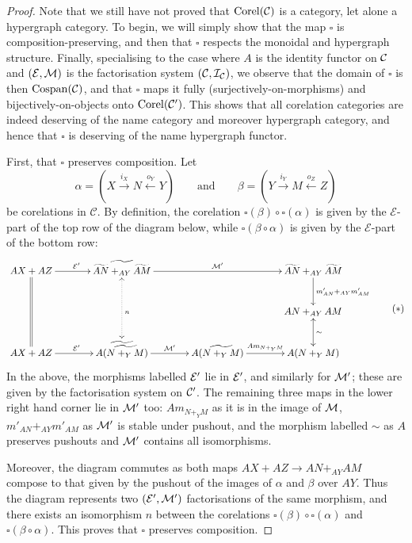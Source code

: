 \begin{proof}
  Note that we still have not proved that $\operatorname{{Corel}}(\mathcal C)$ is a category, let
  alone a hypergraph category. To begin, we will simply show that the map
  $\square$ is composition-preserving, and then that $\square$ respects the
  monoidal and hypergraph structure. Finally, specialising to the case where $A$
  is the identity functor on $\mathcal C$ and $(\mathcal E,\mathcal M)$ is the factorisation
  system $(\mathcal C, \mathcal I_{\mathcal C})$, we observe that the domain of $\square$ is
  then $\operatorname{{Cospan}}(\mathcal C)$, and that $\square$ maps it fully
  (surjectively-on-morphisms) and bijectively-on-objects onto $\operatorname{{Corel}}(\mathcal C')$.
  This shows that all corelation categories are indeed deserving of the name
  category and moreover hypergraph category, and hence that $\square$ is
  deserving of the name hypergraph functor.

  First, that $\square$ preserves composition. Let
  \[
    \alpha = (X \stackrel{i_X}{\longrightarrow} N \stackrel{o_Y}{\longleftarrow} Y)
    \qquad \mbox{and} \qquad 
    \beta = (Y \stackrel{i_Y}{\longrightarrow} M \stackrel{o_Z}{\longleftarrow} Z)
  \]
  be corelations in $\mathcal C$. By definition, the corelation $\square(\beta)
  \circ \square(\alpha)$ is given by the $\mathcal E$-part of the top row of the
  diagram below, while $\square(\beta \circ \alpha)$ is given by the $\mathcal
  E$-part of the bottom row:
  \[ \label{diag.eparts}
    \begin{aligned}
      \xymatrixcolsep{3pc}
      \xymatrixrowsep{2pc}
      \xymatrix{
	AX+AZ \ar[r]^{\mc E'} \ar@{=}[dd] & \widetilde{\widetilde{AN}+_{AY}\widetilde{AM}}
	\ar[rr]^{\mc M'} \ar@{<.>}[dd]^{n} && \widetilde{AN}+_{AY}\widetilde{AM}
	\ar[d]^{m'_{AN}+_{AY}m'_{AM}} \\
	&&& AN+_{AY}AM \\
	AX+AZ \ar[r]^{\mc E'} & \widetilde{A(\widetilde{N+_YM})} \ar[r]^{\mc M'} &
	A(\widetilde{N+_YM}) \ar[r]^{Am_{N+_YM}} & A(N+_YM) \ar@{<->}[u]_{\sim}
      }
    \end{aligned}
    \tag{$\ast$}
  \]
  In the above, the morphisms labelled $\mathcal E'$ lie in $\mathcal E'$, and similarly
  for $\mathcal M'$; these are given by the factorisation system on $\mathcal C'$.  The
  remaining three maps in the lower right hand corner lie in $\mathcal M'$ too:
  $Am_{N+_YM}$ as it is in the image of $\mathcal M$, $m'_{AN}+_{AY}m'_{AM}$ as $\mathcal
  M'$ is stable under pushout, and the morphism labelled $\sim$ as $A$ preserves
  pushouts and $\mathcal M'$ contains all isomorphisms. 

  Moreover, the diagram commutes as both maps $AX+AZ \to AN+_{AY}AM$ compose to
  that given by the pushout of the images of $\alpha$ and $\beta$ over $AY$.
  Thus the diagram represents two $(\mathcal E', \mathcal M')$ factorisations of the same
  morphism, and there exists an isomorphism $n$ between the corelations
  $\square(\beta) \circ \square(\alpha)$ and $\square(\beta\circ\alpha)$. This
  proves that $\square$ preserves composition.


\end{proof}
